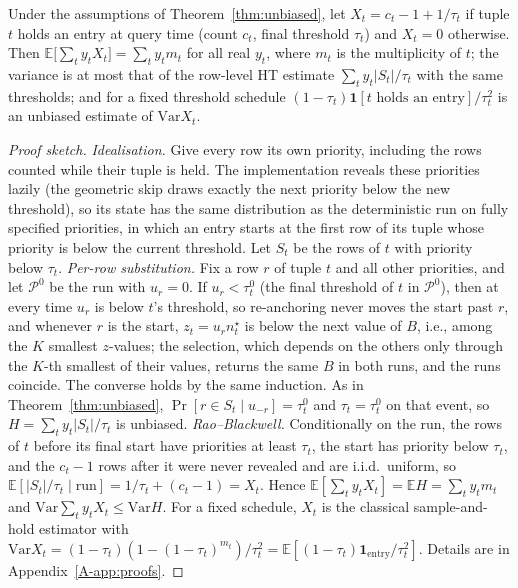 \documentclass[sigconf]{acmart}
\newcommand{\E}{\mathbb{E}}
\newcommand{\Var}{\mathrm{Var}}
\newcommand{\nstar}{n^{\star}}
\newcommand{\apx}[1]{Appendix~\ref{A-#1}}
\begin{document}
\begin{theorem}\label{thm:hold}
Under the assumptions of Theorem~\ref{thm:unbiased}, let $X_t=c_t-1+1/\tau_t$ if tuple $t$ holds an
entry at query time (count $c_t$, final threshold $\tau_t$) and $X_t=0$ otherwise. Then
$\E\bigl[\sum_t y_tX_t\bigr]=\sum_t y_t m_t$ for all real $y_t$, where $m_t$ is the multiplicity of $t$;
the variance is at most that of the row-level HT estimate $\sum_t y_t|S_t|/\tau_t$ with the same
thresholds; and for a fixed threshold schedule $(1-\tau_t)\mathbf 1[t\text{ holds an entry}]/\tau_t^2$ is an
unbiased estimate of $\Var X_t$.
\end{theorem}
\begin{proof}[Proof sketch]
\emph{Idealisation.} Give every row its own priority, including the rows counted while their tuple is
held. The implementation reveals these priorities lazily (the geometric skip draws exactly the next
priority below the new threshold), so its state has the same distribution as the deterministic run on
fully specified priorities, in which an entry starts at the first row of its tuple whose priority is
below the current threshold. Let $S_t$ be the rows of $t$ with priority below $\tau_t$.
\emph{Per-row substitution.} Fix a row $r$ of tuple $t$ and all other priorities, and let
$\mathcal P^0$ be the run with $u_r=0$. If $u_r<\tau^0_t$ (the final threshold of $t$ in $\mathcal P^0$),
then at every time $u_r$ is below $t$'s threshold, so re-anchoring never moves the start past $r$, and
whenever $r$ is the start, $z_t=u_r\nstar_t$ is below the next value of $B$, i.e., among the $K$ smallest
$z$-values; the selection, which depends on the others only through the $K$-th smallest of their values,
returns the same $B$ in both runs, and the runs coincide. The converse holds by the same induction. As in
Theorem~\ref{thm:unbiased}, $\Pr[r\in S_t\mid u_{-r}]=\tau^0_t$ and $\tau_t=\tau^0_t$ on that event, so
$H=\sum_t y_t|S_t|/\tau_t$ is unbiased. \emph{Rao--Blackwell.} Conditionally on the run, the rows of $t$
before its final start have priorities at least $\tau_t$, the start has priority below $\tau_t$, and the
$c_t-1$ rows after it were never revealed and are i.i.d.\ uniform, so
$\E[|S_t|/\tau_t\mid\text{run}]=1/\tau_t+(c_t-1)=X_t$. Hence $\E[\sum_t y_tX_t]=\E H=\sum_t y_tm_t$ and
$\Var\sum_t y_tX_t\le\Var H$. For a fixed schedule, $X_t$ is the classical sample-and-hold estimator with
$\Var X_t=(1-\tau_t)(1-(1-\tau_t)^{m_t})/\tau_t^2=\E[(1-\tau_t)\mathbf 1_{\text{entry}}/\tau_t^2]$.
Details are in \apx{app:proofs}.
\end{proof}
\end{document}
